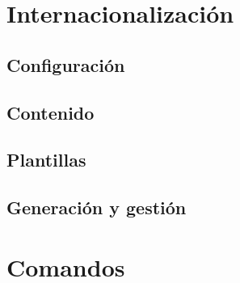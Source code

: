 
\section{Internacionalización}

\subsection{Configuración}
\subsection{Contenido}
\subsection{Plantillas}
\subsection{Generación y gestión}


\section{Comandos}


